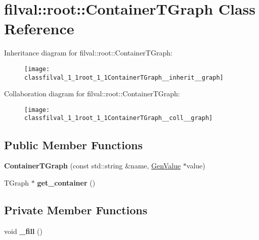 \hypertarget{classfilval_1_1root_1_1ContainerTGraph}{}\section{filval\+:\+:root\+:\+:Container\+T\+Graph Class Reference}
\label{classfilval_1_1root_1_1ContainerTGraph}


Inheritance diagram for filval\+:\+:root\+:\+:Container\+T\+Graph\+:
\nopagebreak
\begin{figure}[H]
\begin{center}
\leavevmode
\texttt{[image: classfilval\_1\_1root\_1\_1ContainerTGraph\_\_inherit\_\_graph]}
\end{center}
\end{figure}


Collaboration diagram for filval\+:\+:root\+:\+:Container\+T\+Graph\+:
\nopagebreak
\begin{figure}[H]
\begin{center}
\leavevmode
\texttt{[image: classfilval\_1\_1root\_1\_1ContainerTGraph\_\_coll\_\_graph]}
\end{center}
\end{figure}
\subsection*{Public Member Functions}
\begin{DoxyCompactItemize}
\item 
\hypertarget{classfilval_1_1root_1_1ContainerTGraph_add02321edcd388c45ef59884c814050e}{}\label{classfilval_1_1root_1_1ContainerTGraph_add02321edcd388c45ef59884c814050e} 
{\bfseries Container\+T\+Graph} (const std\+::string \&name, \hyperlink{classfilval_1_1GenValue}{Gen\+Value} $\ast$value)
\item 
\hypertarget{classfilval_1_1root_1_1ContainerTGraph_a3fafbc71213a024e07658ad9205f6270}{}\label{classfilval_1_1root_1_1ContainerTGraph_a3fafbc71213a024e07658ad9205f6270} 
T\+Graph $\ast$ {\bfseries get\+\_\+container} ()
\end{DoxyCompactItemize}
\subsection*{Private Member Functions}
\begin{DoxyCompactItemize}
\item 
\hypertarget{classfilval_1_1root_1_1ContainerTGraph_a18b70d0de4096602e7b77586ae2487ad}{}\label{classfilval_1_1root_1_1ContainerTGraph_a18b70d0de4096602e7b77586ae2487ad} 
void {\bfseries \+\_\+fill} ()
\end{DoxyCompactItemize}
